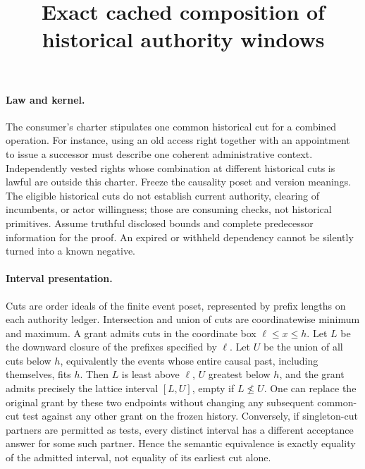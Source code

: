 \documentclass{article}
\title{Exact cached composition of historical authority windows}
\begin{document}
\maketitle
\paragraph{Law and kernel.}
The consumer's charter stipulates one common historical cut for a combined operation. For instance, using an old access right together with an appointment to issue a successor must describe one coherent administrative context. Independently vested rights whose combination at different historical cuts is lawful are outside this charter. Freeze the causality poset and version meanings. The eligible historical cuts do not establish current authority, clearing of incumbents, or actor willingness; those are consuming checks, not historical primitives. Assume truthful disclosed bounds and complete predecessor information for the proof. An expired or withheld dependency cannot be silently turned into a known negative.

\paragraph{Interval presentation.}
Cuts are order ideals of the finite event poset, represented by prefix lengths on each authority ledger. Intersection and union of cuts are coordinatewise minimum and maximum. A grant admits cuts in the coordinate box \(\ell\le x\le h\). Let \(L\) be the downward closure of the prefixes specified by \(\ell\). Let \(U\) be the union of all cuts below \(h\), equivalently the events whose entire causal past, including themselves, fits \(h\). Then \(L\) is least above \(\ell\), \(U\) greatest below \(h\), and the grant admits precisely the lattice interval \([L,U]\), empty if \(L\not\le U\). One can replace the original grant by these two endpoints without changing any subsequent common-cut test against any other grant on the frozen history. Conversely, if singleton-cut partners are permitted as tests, every distinct interval has a different acceptance answer for some such partner. Hence the semantic equivalence is exactly equality of the admitted interval, not equality of its earliest cut alone.
\end{document}
